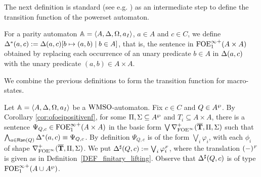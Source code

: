 %
%

The next definition is standard (see e.g.  \cite{Walukiewicz96,Ven08}) as an intermediate step to define the transition function of the powerset automaton.

\begin{definition}\label{DEF_delta star} For a parity automaton $\mathbb{A} = \langle{A,\Delta,\Omega,a_I}\rangle$, $a \in A$ and $c \in C$, we define $\Delta^{*}(a,c) \mathrel{: =} \Delta(a,c)[b \mapsto (a,b) \mid b \in A]$, that is, the sentence in ${\mathrm{FOE}^{\infty}_1}^+(A\times A)$ obtained by replacing each occurrence of an unary predicate $b \in A$ in $\Delta(a,c)$ with the unary predicate $(a,b) \in A \times A$. \end{definition}

We combine the previous definitions to form the transition function for macro-states.

\begin{definition}\label{PROP_DeltaPowerset}
Let $\mathbb{A} = \langle{A,\Delta,\Omega,a_I}\rangle$ be a $\mathrm{WMSO}$-automaton. Fix $c \in C$ and $Q \in A^{\wp}$. By Corollary \ref{cor:ofoeipositivenf}, for some $\Pi,\Sigma \subseteq A^{\wp}$ and $T_i \subseteq A \times A$, there is a sentence $\Psi_{Q,c} \in {\ensuremath{\mathrm{FOE}^{\infty}_1}}^+(A\times A)$ in the basic form $\bigvee \nabla^+_{\mathrm{FOE}^{\infty}}(\overline{{\mathbf{T}}},\Pi,\Sigma)$ such that $\bigwedge_{a \in \mathsf{Ran}(Q)} \Delta^{*}(a,c) \equiv \Psi_{Q,c}$. By definition $\Psi_{Q,c}$ is of the form $\bigvee_{i}\varphi_i$, with each $\phi_{i}$ of shape $\nabla^+_{\mathrm{FOE}^{\infty}}(\overline{{\mathbf{T}}},\Pi,\Sigma)$. We put $\Delta^{\sharp}(Q,c) := \bigvee_{i}\varphi_i^{{\scriptscriptstyle F}}$, where the translation $(-)^{{\scriptscriptstyle F}}$ is given as in Definition~\ref{DEF_finitary_lifting}. Observe that $\Delta^{\sharp}(Q,c)$ is of type ${\mathrm{FOE}^{\infty}_1}^+(A \cup A^{\wp})$.
\end{definition}

